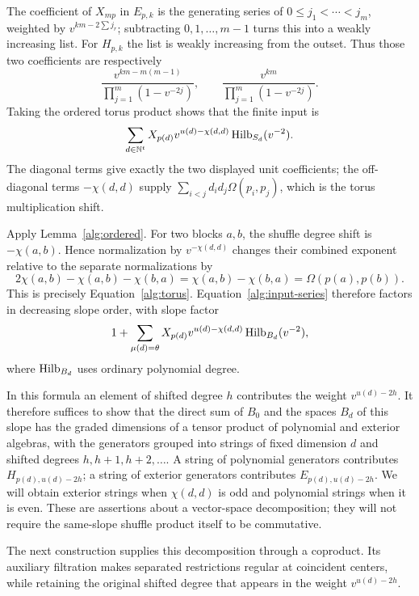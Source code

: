 The coefficient of $X_{mp}$ in $E_{p,k}$ is the generating series of
$0\le j_1<\cdots<j_m$, weighted by
$v^{km-2\sum j_r}$; subtracting $0,1,\ldots,m-1$ turns this into a
weakly increasing list.  For $H_{p,k}$ the list is weakly increasing
from the outset.  Thus those two coefficients are respectively
\[
 \frac{v^{km-m(m-1)}}{\prod_{j=1}^m(1-v^{-2j})},
 \qquad
 \frac{v^{km}}{\prod_{j=1}^m(1-v^{-2j})}.
\]
Taking the ordered torus product shows that the finite input is
\begin{equation}\label{alg:input-series}
 \sum_{d\in\mathbb N^t}X_{p(d)}
       v^{u(d)-\chi(d,d)}\operatorname{Hilb}_{S_d}(v^{-2}).
\end{equation}
The diagonal terms give exactly the two displayed unit coefficients;
the off-diagonal terms $-\chi(d,d)$ supply
$\sum_{i<j}d_id_j\Omega(p_i,p_j)$, which is the torus multiplication
shift.

Apply Lemma~\ref{alg:ordered}.  For two blocks $a,b$, the shuffle
degree shift is $-\chi(a,b)$.  Hence normalization by
$v^{-\chi(d,d)}$ changes their combined exponent relative to the
separate normalizations by
\[
 2\chi(a,b)-\chi(a,b)-\chi(b,a)
     =\chi(a,b)-\chi(b,a)=\Omega(p(a),p(b)).
\]
This is precisely Equation~\eqref{alg:torus}.  Equation~\eqref{alg:input-series}
therefore factors in decreasing slope order, with slope factor
\begin{equation}\label{alg:slope-factor}
 1+\sum_{\mu(d)=\theta}X_{p(d)}
          v^{u(d)-\chi(d,d)}\operatorname{Hilb}_{B_d}(v^{-2}),
\end{equation}
where $\operatorname{Hilb}_{B_d}$ uses ordinary polynomial degree.

In this formula an element of shifted degree $h$ contributes the
weight $v^{u(d)-2h}$.  It therefore suffices to show that the direct
sum of $B_0$ and the spaces $B_d$ of this slope has the graded
dimensions of a tensor product of polynomial and exterior algebras,
with the generators grouped into strings of fixed dimension $d$ and
shifted degrees $h,h+1,h+2,\ldots$.  A string of polynomial
generators contributes $H_{p(d),u(d)-2h}$; a string of exterior
generators contributes $E_{p(d),u(d)-2h}$.  We will obtain exterior
strings when $\chi(d,d)$ is odd and polynomial strings when it is
even.  These are assertions about a vector-space decomposition;
they will not require the same-slope shuffle product itself to be
commutative.

The next construction supplies this decomposition through a
coproduct.  Its auxiliary filtration makes separated restrictions
regular at coincident centers, while retaining the original shifted
degree that appears in the weight $v^{u(d)-2h}$.

